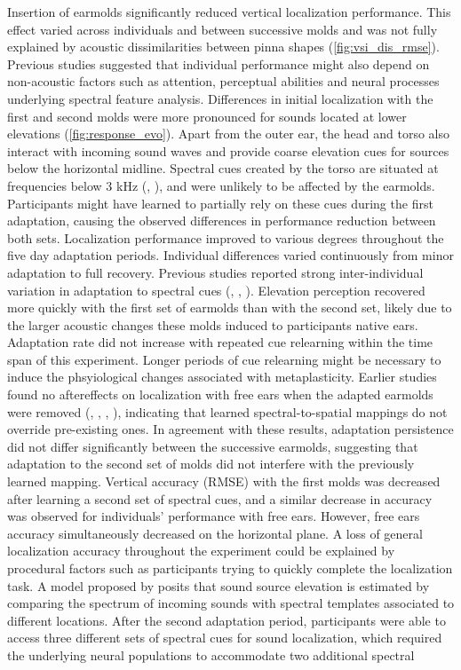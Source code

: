 Insertion of earmolds significantly reduced vertical localization performance. This effect varied across individuals and between successive molds and was not fully explained by acoustic dissimilarities between pinna shapes (\cref{fig:vsi_dis_rmse}). Previous studies suggested that individual performance might also depend on non-acoustic factors such as attention, perceptual abilities and neural processes underlying spectral feature analysis. Differences in initial localization with the first and second molds were more pronounced for sounds located at lower elevations (\cref{fig:response_evo}). Apart from the outer ear, the head and torso also interact with incoming sound waves and provide coarse elevation cues for sources below the horizontal midline. Spectral cues created by the torso are situated at frequencies below 3 kHz (\citet{asano_role_1990}, \citet{algazi_elevation_2001}), and were unlikely to be affected by the earmolds. Participants might have learned to partially rely on these cues during the first adaptation, causing the observed differences in performance reduction between both sets. Localization performance improved to various degrees throughout the five day adaptation periods. Individual differences varied continuously from minor adaptation to full recovery. Previous studies reported strong inter-individual variation in adaptation to spectral cues (\citet{hofman_relearning_1998}, \citet{wanrooij_relearning_2005}, \citet{trapeau_fast_2016}). Elevation perception recovered more quickly with the first set of earmolds than with the second set, likely due to the larger acoustic changes these molds induced to participants native ears. Adaptation rate did not increase with repeated cue relearning within the time span of this experiment. Longer periods of cue relearning might be necessary to induce the phsyiological changes associated with metaplasticity. Earlier studies found no aftereffects on localization with free ears when the adapted earmolds were removed (\citet{carlile_relearning_2014}, \citet{hofman_relearning_1998}, \citet{trapeau_fast_2016}, \citet{wanrooij_relearning_2005}), indicating that learned spectral-to-spatial mappings do not override pre-existing ones. In agreement with these results, adaptation persistence did not differ significantly between the successive earmolds, suggesting that adaptation to the second set of molds did not interfere with the previously learned mapping. Vertical accuracy (RMSE) with the first molds was decreased after learning a second set of spectral cues, and a similar decrease in accuracy was observed for individuals' performance with free ears. However, free ears accuracy simultaneously decreased on the horizontal plane. A loss of general localization accuracy throughout the experiment could be explained by procedural factors such as participants trying to quickly complete the localization task. A model proposed by \citet{hofman_spectro-temporal_1998} posits that sound source elevation is estimated by comparing the spectrum of incoming sounds with spectral templates associated to different locations. After the second adaptation period, participants were able to access three different sets of spectral cues for sound localization, which required the underlying neural populations to accommodate two additional spectral 